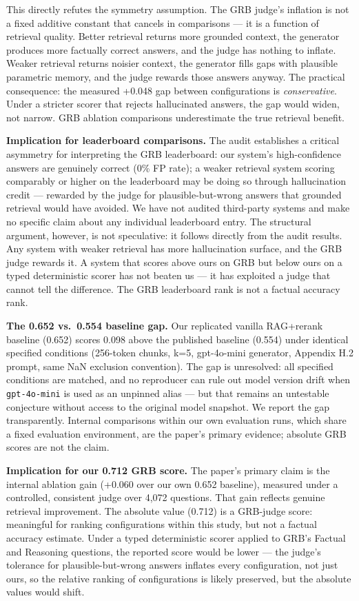 \documentclass[
]{article}
\begin{document}
This directly refutes the symmetry assumption. The GRB judge's inflation
is not a fixed additive constant that cancels in comparisons --- it is a
function of retrieval quality. Better retrieval returns more grounded
context, the generator produces more factually correct answers, and the
judge has nothing to inflate. Weaker retrieval returns noisier context,
the generator fills gaps with plausible parametric memory, and the judge
rewards those answers anyway. The practical consequence: the measured
+0.048 gap between configurations is \emph{conservative}. Under a
stricter scorer that rejects hallucinated answers, the gap would widen,
not narrow. GRB ablation comparisons underestimate the true retrieval
benefit.

\textbf{Implication for leaderboard comparisons.} The audit establishes
a critical asymmetry for interpreting the GRB leaderboard: our system's
high-confidence answers are genuinely correct (0\% FP rate); a weaker
retrieval system scoring comparably or higher on the leaderboard may be
doing so through hallucination credit --- rewarded by the judge for
plausible-but-wrong answers that grounded retrieval would have avoided.
We have not audited third-party systems and make no specific claim about
any individual leaderboard entry. The structural argument, however, is
not speculative: it follows directly from the audit results. Any system
with weaker retrieval has more hallucination surface, and the GRB judge
rewards it. A system that scores above ours on GRB but below ours on a
typed deterministic scorer has not beaten us --- it has exploited a
judge that cannot tell the difference. The GRB leaderboard rank is not a
factual accuracy rank.

\textbf{The 0.652 vs.~0.554 baseline gap.} Our replicated vanilla
RAG+rerank baseline (0.652) scores 0.098 above the published baseline
(0.554) under identical specified conditions (256-token chunks, k=5,
gpt-4o-mini generator, Appendix H.2 prompt, same NaN exclusion
convention). The gap is unresolved: all specified conditions are
matched, and no reproducer can rule out model version drift when
\texttt{gpt-4o-mini} is used as an unpinned alias --- but that remains
an untestable conjecture without access to the original model snapshot.
We report the gap transparently. Internal comparisons within our own
evaluation runs, which share a fixed evaluation environment, are the
paper's primary evidence; absolute GRB scores are not the claim.

\textbf{Implication for our 0.712 GRB score.} The paper's primary claim
is the internal ablation gain (+0.060 over our own 0.652 baseline),
measured under a controlled, consistent judge over 4,072 questions. That
gain reflects genuine retrieval improvement. The absolute value (0.712)
is a GRB-judge score: meaningful for ranking configurations within this
study, but not a factual accuracy estimate. Under a typed deterministic
scorer applied to GRB's Factual and Reasoning questions, the reported
score would be lower --- the judge's tolerance for plausible-but-wrong
answers inflates every configuration, not just ours, so the relative
ranking of configurations is likely preserved, but the absolute values
would shift.
\end{document}
